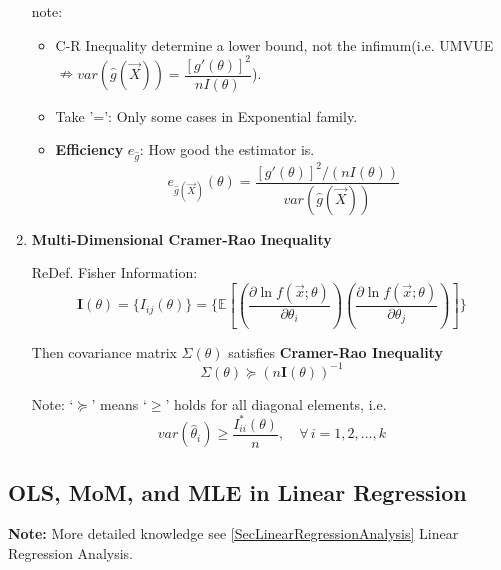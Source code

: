 \begin{enumerate}[topsep=2pt,itemsep=0pt]
        note:
        \begin{itemize}
            \item C-R Inequality determine a lower bound, not the infimum(i.e. UMVUE$\nRightarrow var(\hat{g}(\vec{X}))=\dfrac{[g'(\theta)]^2}{nI(\theta)}$).
            \item Take '=': Only some cases in Exponential family.
            \item \textbf{Efficiency} $ e_{\hat{g}} $: How good the estimator is.
            \begin{equation}
                e_{\hat{g}(\vec{X})}(\theta)=   \frac{[g'(\theta)]^2/(nI(\theta))}{var(\hat{g}(\vec{X}))} 
            \end{equation} 
        \end{itemize}


    \item \textbf{Multi-Dimensional Cramer-Rao Inequality}
    
        ReDef. Fisher Information:
        \begin{equation}
            \bm{I}(\theta)=\{I_{ij}(\theta)\}=\{\mathbb{E}\left[\left(\frac{\partial\ln f(\vec{x};\theta)}{\partial\theta_i}\right)\left(\frac{\partial\ln f(\vec{x};\theta)}{\partial\theta_j}\right)\right]\}  
        \end{equation}

        Then covariance matrix $\Sigma(\theta)$ satisfies \textbf{Cramer-Rao Inequality}
        \begin{equation}
            \Sigma(\theta)\succeq  (n\bm{I}(\theta))^{-1}
        \end{equation}

        Note: `$\succeq $' means `$ \geq $' holds for all diagonal elements, i.e.
    \begin{equation}
        var(\hat{\theta}_i)\geq \frac{I^*_{ii}(\theta)}{n},\quad \forall\,i=1,2,\ldots,k  
    \end{equation}


        
    \end{enumerate}






\subsection{OLS, MoM, and MLE in Linear Regression}\label{SubSectionMoM_MLE_LinearRegression}
    \textbf{Note:} More detailed knowledge see \autoref{SecLinearRegressionAnalysis} Linear Regression Analysis.

